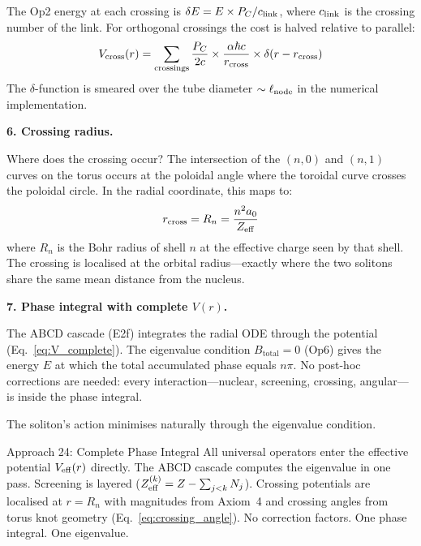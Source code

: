 The Op2 energy at each crossing is
$\delta E = E \times P_C / c_{\rm link}$,
where $c_{\rm link}$ is the crossing number
of the link.  For orthogonal crossings the
cost is halved relative to parallel:
\begin{equation}
    V_{\rm cross}(r) =
    \sum_{\text{crossings}} \frac{P_C}{2c}
    \times \frac{\alpha\hbar c}{r_{\rm cross}}
    \times \delta(r - r_{\rm cross})
    \label{eq:V_crossing}
\end{equation}
The $\delta$-function is smeared over the
tube diameter $\sim \ell_{\rm node}$ in the
numerical implementation.

\noindent\textbf{6. Crossing radius.}

Where does the crossing occur?  The
intersection of the $(n,0)$ and $(n,1)$
curves on the torus occurs at the poloidal
angle where the toroidal curve crosses the
poloidal circle.  In the radial coordinate,
this maps to:
\begin{equation}
    r_{\rm cross} = R_n
    = \frac{n^2 a_0}{Z_{\rm eff}}
\end{equation}
where $R_n$ is the Bohr radius of shell $n$
at the effective charge seen by that shell.
The crossing is localised at the orbital
radius---exactly where the two solitons
share the same mean distance from the nucleus.

\noindent\textbf{7. Phase integral with complete
$V(r)$.}

The ABCD cascade (E2f) integrates the radial
ODE through the potential
(Eq.~\ref{eq:V_complete}).  The eigenvalue
condition $B_{\text{total}} = 0$ (Op6) gives
the energy $E$ at which the total accumulated
phase equals $n\pi$.  No post-hoc corrections
are needed: every interaction---nuclear,
screening, crossing, angular---is inside
the phase integral.

The soliton's action minimises naturally
through the eigenvalue condition.

\begin{resultbox}{Approach 24: Complete Phase
Integral}
All universal operators enter the effective
potential $V_{\rm eff}(r)$ directly.  The ABCD
cascade computes the eigenvalue in one pass.
Screening is layered
($Z_{\rm eff}^{(k)} = Z - \sum_{j<k} N_j$).
Crossing potentials are localised at $r = R_n$
with magnitudes from Axiom~4 and crossing
angles from torus knot geometry
(Eq.~\ref{eq:crossing_angle}).  No correction
factors.  One phase integral.  One eigenvalue.
\end{resultbox}


